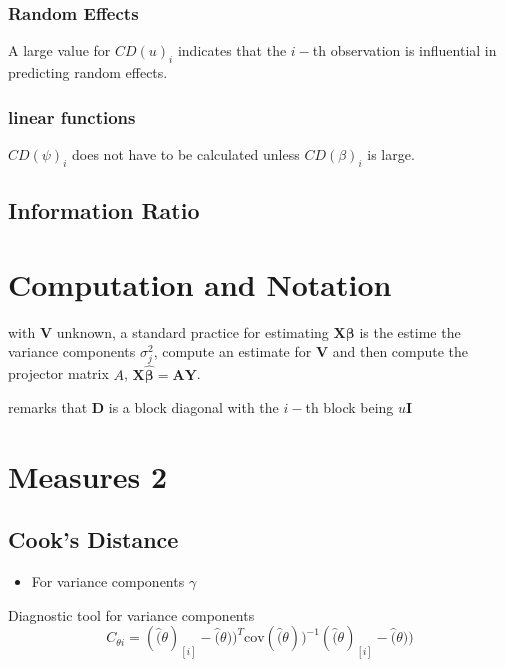 \documentclass[12pt, a4paper]{report}
\theoremstyle{plain}
\theoremstyle{definition}
\theoremstyle{remark}
\begin{document}
\newpage
\subsubsection{Random Effects}

A large value for $CD(u)_i$ indicates that the $i-$th observation is influential in predicting random effects.

\subsubsection{linear functions}

$CD(\psi)_i$ does not have to be calculated unless $CD(\beta)_i$ is large.


\subsection{Information Ratio}


\newpage
\section{Computation and Notation } %
with $\boldsymbol{V}$ unknown, a standard practice for estimating $\boldsymbol{X \beta}$ is the estime the variance components $\sigma^2_j$,
compute an estimate for $\boldsymbol{V}$ and then compute the projector matrix $A$, $\boldsymbol{X \hat{\beta}}  = \boldsymbol{AY}$.


\citet{Zewotir} remarks that $\boldsymbol{D}$ is a block diagonal with the $i-$th block being $u \boldsymbol{I}$
\newpage
\section{Measures 2} %

\subsection{Cook's Distance} %
\begin{itemize}
\item For variance components $\gamma$
\end{itemize}

Diagnostic tool for variance components
\[ C_{\theta i} =(\hat(\theta)_{[i]} - \hat(\theta))^{T}\mbox{cov}( \hat(\theta))^{-1}(\hat(\theta)_{[i]} - \hat(\theta))\]
\end{document}
